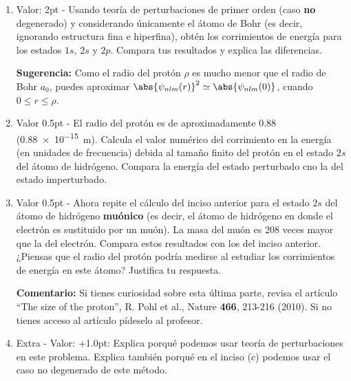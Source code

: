 \documentclass[./../main.tex]{subfiles}
\begin{document}
\begin{exercise}
\begin{enumerate}
            \item Valor: 2pt - Usando teoría de perturbaciones de primer orden (caso \textbf{no} degenerado) y considerando únicamente el átomo de Bohr (es decir, ignorando estructura fina e hiperfina), obtén los corrimientos de energía para los estados \(1s\), \(2s\) y \(2p\). Compara tus resultados y explica las diferencias.
            
            \textbf{Sugerencia:} Como el radio del protón \(\rho\) es mucho menor que el radio de Bohr \(a_{0}\), puedes aproximar \(\abs{\psi_{nlm}(r)}^{2} \simeq \abs{\psi_{nlm}(0)}\), cuando \(0 \leq r \leq \rho\).
            
            \item Valor 0.5pt - El radio del protón es de aproximadamente \qty{0.88}{\fm} (\qty{0.88e-15}{\m}). Calcula el valor numérico del corrimiento en la energía (en unidades de frecuencia) debida al tamaño finito del protón en el estado \(2s\) del átomo de hidrógeno. Compara la energía del estado perturbado cno la del estado imperturbado.
            
            \item Valor 0.5pt - Ahora repite el cálculo del inciso anterior para el estado \(2s\) del átomo de hidrógeno \textbf{muónico} (es decir, el átomo de hidrógeno en donde el electrón es sustituido por un muón). La masa del muón es 208 veces mayor que la del electrón. Compara estos resultados con los del inciso anterior. ¿Piensas que el radio del protón podría medirse al estudiar los corrimientos de energía en este átomo? Justifica tu respuesta.
            
            \textbf{Comentario:} Si tienes curiosidad sobre esta última parte, revisa el artículo ``The size of the proton'', R. Pohl et al., Nature \textbf{466}, 213-216 (2010). Si no tienes acceso al artículo pídeselo al profesor.
            
            \color{blue}
            \item Extra - Valor: +1.0pt: Explica porqué podemos usar teoría de perturbaciones en este problema. Explica también porqué en el inciso (c) podemos usar el caso no degenerado de este método.
        \end{enumerate}
    \end{exercise}
\end{document}
